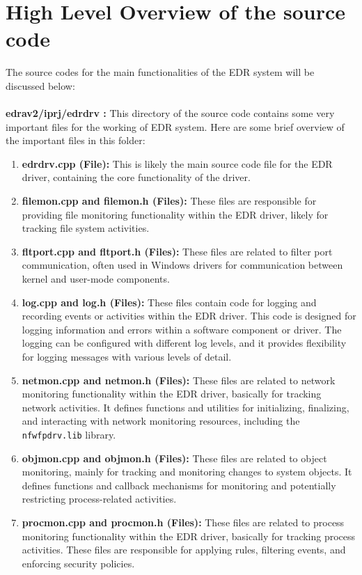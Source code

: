 \documentclass{article}
\begin{document}
\section{High Level Overview of the source code}
The source codes for the main functionalities of the EDR system will be discussed below: \\ \\
\textbf{edrav2/iprj/edrdrv :} This directory of the source code contains some very important files for the working of EDR system. Here are some brief overview of the important files in this folder: \\ 
\begin{enumerate}
     \item \textbf{edrdrv.cpp (File):} This is likely the main source code file for the EDR driver, containing the core functionality of the driver.
    \item \textbf{filemon.cpp and filemon.h (Files):} These files are responsible for providing file monitoring functionality within the EDR driver, likely for tracking file system activities.
    \item \textbf{fltport.cpp and fltport.h (Files):} These files are related to filter port communication, often used in Windows drivers for communication between kernel and user-mode components.
    \item \textbf{log.cpp and log.h (Files):} These files contain code for logging and recording events or activities within the EDR driver. This code is designed for logging information and errors within a software component or driver. The logging can be configured with different log levels, and it provides flexibility for logging messages with various levels of detail.
    \item \textbf{netmon.cpp and netmon.h (Files):} These files are related to network monitoring functionality within the EDR driver, basically for tracking network activities. It defines functions and utilities for initializing, finalizing, and interacting with network monitoring resources, including the \texttt{nfwfpdrv.lib} library.
    \item \textbf{objmon.cpp and objmon.h (Files):} These files are related to object monitoring, mainly for tracking and monitoring changes to system objects. It defines functions and callback mechanisms for monitoring and potentially restricting process-related activities.
    \item \textbf{procmon.cpp and procmon.h (Files):} These files are related to process monitoring functionality within the EDR driver, basically for tracking process activities. These files are responsible for applying rules, filtering events, and enforcing security policies.

\end{enumerate}
\end{document}
